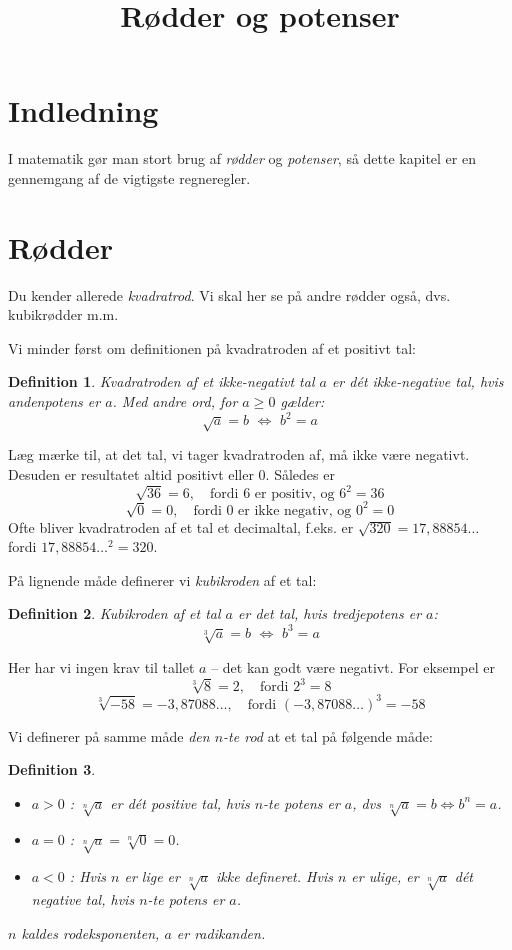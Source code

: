 \documentclass[12pt,oneside,a4paper]{article}
\title{Rødder og potenser}
\date{\vspace{-5ex}}
\theoremstyle{plain}
\newtheorem*{mydef}{Definition}
\begin{document}
\maketitle

\section*{Indledning}
I matematik gør man stort brug af {\em rødder} og {\em potenser}, så dette
kapitel er en gennemgang af de vigtigste regneregler.

\section*{Rødder}
Du kender allerede {\em kvadratrod}. Vi skal her se på andre rødder også, dvs.
kubikrødder m.m.

Vi minder først om definitionen på kvadratroden af et positivt tal:
\begin{mydef}
    Kvadratroden af et ikke-negativt tal $a$ er dét ikke-negative tal, hvis
    andenpotens er $a$. Med andre ord, for $a\ge 0$ gælder:
    $$
    \sqrt{a} = b \,\, \Leftrightarrow \,\, b^2 = a
    $$
\end{mydef}

Læg mærke til, at det tal, vi tager kvadratroden af, må ikke være negativt. Desuden er resultatet altid positivt eller 0. Således er
$$
\sqrt{36} = 6,\quad \mbox{fordi 6 er positiv, og $6^2=36$}
$$
$$
\sqrt{0} = 0,\quad \mbox{fordi 0 er ikke negativ, og $0^2=0$}
$$
Ofte bliver kvadratroden af et tal et decimaltal, f.eks. er $\sqrt{320} =
17,88854\ldots$ fordi $17,88854\ldots^2 = 320$.

På lignende måde definerer vi {\em kubikroden} af et tal:
\begin{mydef}
    Kubikroden af et tal $a$ er det tal, hvis tredjepotens er $a$:
    $$
    \sqrt[3]{a} = b \,\, \Leftrightarrow \,\, b^3 = a
    $$
\end{mydef}
Her har vi ingen krav til tallet $a$ -- det kan godt være negativt. For
eksempel er
$$
\sqrt[3]{8} = 2,\quad \mbox{fordi $2^3=8$}
$$
$$
\sqrt[3]{-58} = -3,87088\ldots,\quad \mbox{fordi $(-3,87088\ldots)^3=-58$}
$$

Vi definerer på samme måde {\em den $n$-te rod} at et tal på følgende måde:
\begin{mydef}
    \leavevmode
    \begin{itemize}
        \item $a>0$ : $\sqrt[n]{a}$ er dét positive tal, hvis $n$-te potens er
            $a$, dvs $\sqrt[n]{a} = b \Leftrightarrow b^n=a$.
        \item $a=0$ : $\sqrt[n]{a} = \sqrt[n]{0} =0$.
        \item $a<0$ : Hvis $n$ er lige er $\sqrt[n]{a}$ ikke defineret.  Hvis
            $n$ er ulige, er $\sqrt[n]{a}$ dét negative tal, hvis $n$-te potens
            er $a$.
    \end{itemize}

    $n$ kaldes {\em rodeksponenten}, $a$ er {\em radikanden}.
\end{mydef}
\end{document}
